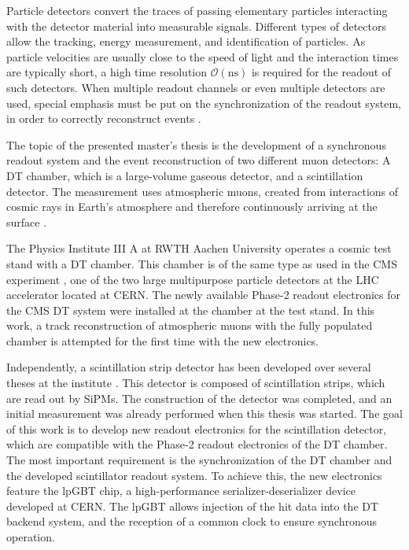 Particle detectors convert the traces of passing elementary particles interacting with the detector material into measurable signals. Different types of detectors allow the tracking, energy measurement, and identification of particles. As particle velocities are usually close to the speed of light and the interaction times are typically short, a high time resolution $\mathcal{O}(\si{\nano\second})$ is required for the readout of such detectors. When multiple readout channels or even multiple detectors are used, special emphasis must be put on the synchronization of the readout system, in order to correctly reconstruct events \cite{Book-KolanoskiWermes}.
\par The topic of the presented master's thesis is the development of a synchronous readout system and the event reconstruction of two different muon detectors: A \ac{DT} chamber, which is a large-volume gaseous detector, and a scintillation detector. The measurement uses atmospheric muons, created from interactions of cosmic rays in Earth's atmosphere and therefore continuously arriving at the surface \cite{PDG2024,CosmicMuon-Shukla}.
\par The Physics Institute III A at RWTH Aachen University operates a cosmic test stand with a \ac{DT} chamber. This chamber is of the same type as used in the \ac{CMS} experiment \cite{CMS-Main}, one of the two large multipurpose particle detectors at the \ac{LHC} accelerator \cite{LHC-Main} located at \acs{CERN}. The newly available Phase-2 readout electronics \cite{CMS-Phase2,CMS-Phase2Muon} for the \ac{CMS} \ac{DT} system were installed at the chamber at the test stand. In this work, a track reconstruction of atmospheric muons with the fully populated chamber is attempted for the first time with the new electronics.
\par Independently, a scintillation strip detector has been developed over several theses at the institute \cite{BSc-Ehlert,MSc-Ehlert}. This detector is composed of scintillation strips, which are read out by \acp{SiPM}. The construction of the detector was completed, and an initial measurement was already performed when this thesis was started. The goal of this work is to develop new readout electronics for the scintillation detector, which are compatible with the Phase-2 readout electronics of the \ac{DT} chamber. The most important requirement is the synchronization of the \ac{DT} chamber and the developed scintillator readout system. To achieve this, the new electronics feature the \ac{lpGBT} chip, a high-performance serializer-deserializer device developed at \acs{CERN}. The \ac{lpGBT} allows injection of the hit data into the \ac{DT} backend system, and the reception of a common clock to ensure synchronous operation.
